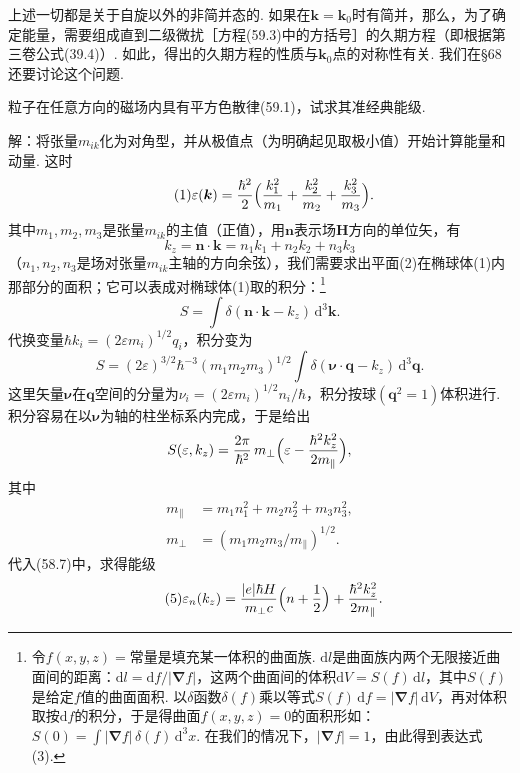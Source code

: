 上述一切都是关于自旋以外的非简并态的. 如果在$\bm k=\bm k_0$时有简并，那么，为了确定能量，需要组成直到二级微扰［方程(59.3)中的方括号］的久期方程（即根据第三卷公式(39.4)）. 如此，得出的久期方程的性质与$\bm k_0$点的对称性有关. 我们在§68还要讨论这个问题.

\begin{xiti}

粒子在任意方向的磁场内具有平方色散律(59.1)，试求其准经典能级.

{\heiti 解：}将张量$m_{ik}$化为对角型，并从极值点（为明确起见取极小值）开始计算能量和动量. 这时
\begin{equation}\tag{1}
\varepsilon(\bm k)=\frac{\hbar^2}{2}\Bigl(\frac{k_1^2}{m_1}+\frac{k_2^2}{m_2}+\frac{k_3^2}{m_3}\Bigr).
\end{equation}
其中$m_1,m_2,m_3$是张量$m_{ik}$的主值（正值），用$\bm n$表示场$\bm H$方向的单位矢，有
\begin{equation}\tag{2}
k_z=\bm n\cdot\bm k=n_1k_1+n_2k_2+n_3k_3
\end{equation}
（$n_1,n_2,n_3$是场对张量$m_{ik}$主轴的方向余弦），我们需要求出平面(2)在椭球体(1)内那部分的面积；它可以表成对椭球体(1)取的积分：\footnote{令$f(x,y,z)=$常量是填充某一体积的曲面族. $\mathrm dl$是曲面族内两个无限接近曲面间的距离：$\mathrm dl=\mathrm df/|\bm\nabla f|$，这两个曲面间的体积$\mathrm dV=S(f)\,\mathrm dl$，其中$S(f)$是给定$f$值的曲面面积. 以$\delta$函数$\delta(f)$乘以等式$S(f)\,\mathrm df=|\bm\nabla f|\,\mathrm dV$，再对体积取按$\mathrm df$的积分，于是得曲面$f(x,y,z)=0$的面积形如：$S(0)=\int|\bm\nabla f|\,\delta(f)\,\mathrm d^3x$. 在我们的情况下，$|\bm\nabla f|=1$，由此得到表达式(3).}
\begin{equation}\tag{3}
S=\int\delta(\bm n\cdot\bm k-k_z)\,\mathrm d^3\bm k.
\end{equation}
代换变量$\hbar k_i=(2\varepsilon m_i)^{1/2}q_i$，积分变为
\begin{equation*}
S=(2\varepsilon)^{3/2}\hbar^{-3}(m_1m_2m_3)^{1/2}
\int\delta(\bm\nu\cdot\bm q-k_z)\,\mathrm d^3\bm q.
\end{equation*}
这里矢量$\bm\nu$在$\bm q$空间的分量为$\nu_i=(2\varepsilon m_i)^{1/2}n_i/\hbar$，积分按球$(\bm q^2=1)$体积进行. 积分容易在以$\bm\nu$为轴的柱坐标系内完成，于是给出
\begin{equation*}
S(\varepsilon,k_z)=\frac{2\pi}{\hbar^2}\,m_{\perp}\Bigl(\varepsilon-\frac{\hbar^2k_z^2}{2m_{\parallel}}\Bigr),
\end{equation*}
其中
\begin{equation}\tag{4}
\begin{aligned}
m_{\parallel}&=m_1n_1^2+m_2n_2^2+m_3n_3^2,\\
m_{\perp}&=(m_1m_2m_3/m_{\parallel})^{1/2}.
\end{aligned}
\end{equation}
代入(58.7)中，求得能级
\begin{equation}\tag{5}
\varepsilon_n(k_z)=\frac{|e|\hbar H}{m_{\perp}c}\Bigl(n+\frac{1}{2}\Bigr)+\frac{\hbar^2k_z^2}{2m_{\parallel}}.
\end{equation}

\end{xiti}


